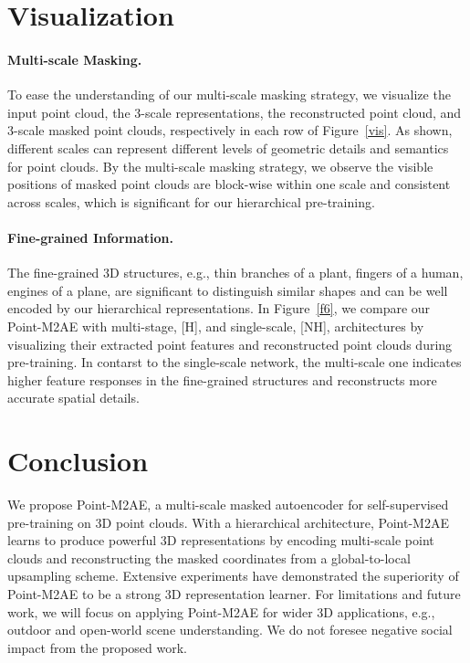 \documentclass{article}
\begin{document}
\section{Visualization}
\paragraph{Multi-scale Masking.}
To ease the understanding of our multi-scale masking strategy, we visualize the input point cloud, the 3-scale representations, the reconstructed point cloud, and 3-scale masked point clouds, respectively in each row of Figure~\ref{vis}. As shown, different scales can represent different levels of geometric details and semantics for point clouds. By the multi-scale masking strategy, we observe the visible positions of masked point clouds are block-wise within one scale and consistent across scales, which is significant for our hierarchical pre-training.
\vspace{-0.1cm}
\paragraph{Fine-grained Information.}
The fine-grained 3D structures, e.g., thin branches of a plant, fingers of a human, engines of a plane, are significant to distinguish similar shapes and can be well encoded by our hierarchical representations. In Figure~\ref{f6}, we compare our Point-M2AE with multi-stage, [H], and single-scale, [NH], architectures by visualizing their extracted point features and reconstructed point clouds during pre-training. In contarst to the single-scale network, the multi-scale one indicates higher feature responses in the fine-grained structures and reconstructs more accurate spatial details.

\vspace{-0.1cm}
\section{Conclusion}
We propose Point-M2AE, a multi-scale masked autoencoder for self-supervised pre-training on 3D point clouds. With a hierarchical architecture, Point-M2AE learns to produce powerful 3D representations by encoding multi-scale point clouds and reconstructing the masked coordinates from a global-to-local upsampling scheme. Extensive experiments have demonstrated the superiority of Point-M2AE to be a strong 3D representation learner.
For limitations and future work, we will focus on applying Point-M2AE for wider 3D applications, e.g., outdoor and open-world scene understanding. We do not foresee negative social impact from the proposed work.
\end{document}
